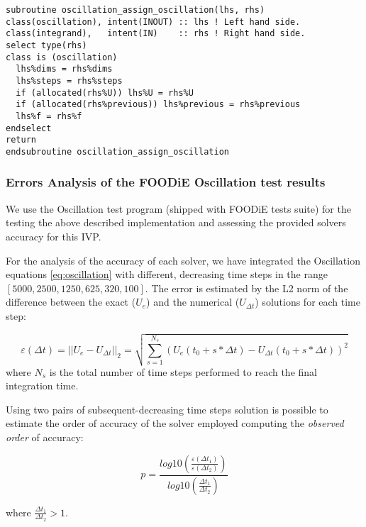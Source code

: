 \documentclass[pdftex,preprint,3p,times,numbers]{elsarticle}
\begin{document}
\begin{lstlisting}[firstnumber=1,style=code,caption={implementation of the \emph{oscillation integrand} assignment},label={list:oscillation_assign}]
subroutine oscillation_assign_oscillation(lhs, rhs)
class(oscillation), intent(INOUT) :: lhs ! Left hand side.
class(integrand),   intent(IN)    :: rhs ! Right hand side.
select type(rhs)
class is (oscillation)
  lhs%dims = rhs%dims
  lhs%steps = rhs%steps
  if (allocated(rhs%U)) lhs%U = rhs%U
  if (allocated(rhs%previous)) lhs%previous = rhs%previous
  lhs%f = rhs%f
endselect
return
endsubroutine oscillation_assign_oscillation
\end{lstlisting}

\subsubsection{Errors Analysis of the FOODiE Oscillation test results}

We use the Oscillation test program (shipped with FOODiE tests suite) for the testing the above described implementation and assessing the provided solvers accuracy for this IVP.

For the analysis of the accuracy of each solver, we have integrated the Oscillation equations \ref{eq:oscillation} with different, decreasing time steps in the range $[5000, 2500, 1250, 625, 320, 100]$. The error is estimated by the L2 norm of the difference between the exact ($U_e$) and the numerical ($U_{\Delta t}$) solutions for each time step:

\begin{equation}
  \varepsilon (\Delta t) = || U_e - U_{\Delta t} ||_2 = \sqrt{ \sum_{s=1}^{N_s} { \left(U_e(t_0 + s * \Delta t) - U_{\Delta t}(t_0 + s * \Delta t) \right)^2 }}
\label{eq:oscillation-error}
\end{equation}
where $N_s$ is the total number of time steps performed to reach the final integration time.

Using two pairs of subsequent-decreasing time steps solution is possible to estimate the order of accuracy of the solver employed computing the \emph{observed order} of accuracy:

\begin{equation}
  p = \frac{log10 \left( \frac{\varepsilon (\Delta t_1)}{\varepsilon (\Delta t_2)} \right)}{log10 \left( \frac{\Delta t_1}{\Delta t_2} \right)}
\label{eq:oscillation-observed-order}
\end{equation}

where $\frac{\Delta t_1}{\Delta t_2}>1$.
\end{document}
